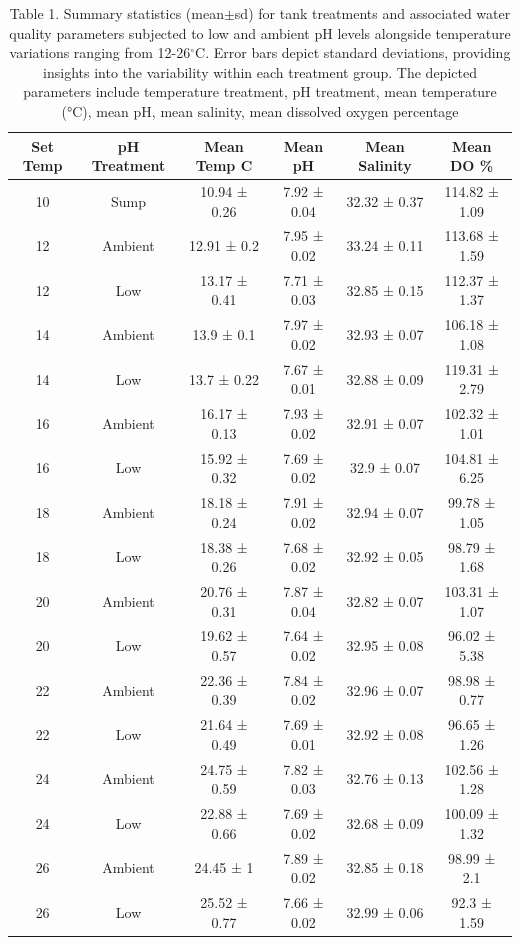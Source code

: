 \documentclass[
]{article}
\begin{document}
\begin{table}[!ht]
    \centering
    \begin{tabular}{|c|c|c|c|c|c|}
    \hline
        \textbf{Set Temp} & \textbf{pH Treatment} & \textbf{Mean Temp C} & \textbf{Mean pH} & \textbf{Mean Salinity} & \textbf{Mean DO \%} \\ \hline
        10 & Sump & 10.94 ± 0.26 & 7.92 ± 0.04 & 32.32 ± 0.37 & 114.82 ± 1.09 \\ \hline
        12 & Ambient & 12.91 ± 0.2 & 7.95 ± 0.02 & 33.24 ± 0.11 & 113.68 ± 1.59 \\ \hline
        12 & Low & 13.17 ± 0.41 & 7.71 ± 0.03 & 32.85 ± 0.15 & 112.37 ± 1.37 \\ \hline
        14 & Ambient & 13.9 ± 0.1 & 7.97 ± 0.02 & 32.93 ± 0.07 & 106.18 ± 1.08 \\ \hline
        14 & Low & 13.7 ± 0.22 & 7.67 ± 0.01 & 32.88 ± 0.09 & 119.31 ± 2.79 \\ \hline
        16 & Ambient & 16.17 ± 0.13 & 7.93 ± 0.02 & 32.91 ± 0.07 & 102.32 ± 1.01 \\ \hline
        16 & Low & 15.92 ± 0.32 & 7.69 ± 0.02 & 32.9 ± 0.07 & 104.81 ± 6.25 \\ \hline
        18 & Ambient & 18.18 ± 0.24 & 7.91 ± 0.02 & 32.94 ± 0.07 & 99.78 ± 1.05 \\ \hline
        18 & Low & 18.38 ± 0.26 & 7.68 ± 0.02 & 32.92 ± 0.05 & 98.79 ± 1.68 \\ \hline
        20 & Ambient & 20.76 ± 0.31 & 7.87 ± 0.04 & 32.82 ± 0.07 & 103.31 ± 1.07 \\ \hline
        20 & Low & 19.62 ± 0.57 & 7.64 ± 0.02 & 32.95 ± 0.08 & 96.02 ± 5.38 \\ \hline
        22 & Ambient & 22.36 ± 0.39 & 7.84 ± 0.02 & 32.96 ± 0.07 & 98.98 ± 0.77 \\ \hline
        22 & Low & 21.64 ± 0.49 & 7.69 ± 0.01 & 32.92 ± 0.08 & 96.65 ± 1.26 \\ \hline
        24 & Ambient & 24.75 ± 0.59 & 7.82 ± 0.03 & 32.76 ± 0.13 & 102.56 ± 1.28 \\ \hline
        24 & Low & 22.88 ± 0.66 & 7.69 ± 0.02 & 32.68 ± 0.09 & 100.09 ± 1.32 \\ \hline
        26 & Ambient & 24.45 ± 1 & 7.89 ± 0.02 & 32.85 ± 0.18 & 98.99 ± 2.1 \\ \hline
        26 & Low & 25.52 ± 0.77 & 7.66 ± 0.02 & 32.99 ± 0.06 & 92.3 ± 1.59 \\ \hline
    \end{tabular}
    \caption{Table 1. Summary statistics (mean$\pm$sd) for tank treatments and associated water quality parameters subjected to low and ambient pH levels alongside temperature variations ranging from 12-26$^\circ$C. Error bars depict standard deviations, providing insights into the variability within each treatment group. The depicted parameters include temperature treatment, pH treatment, mean temperature (°C), mean pH, mean salinity, mean dissolved oxygen percentage}
    \label{meso-stat-summary}
\end{table}
\end{document}
